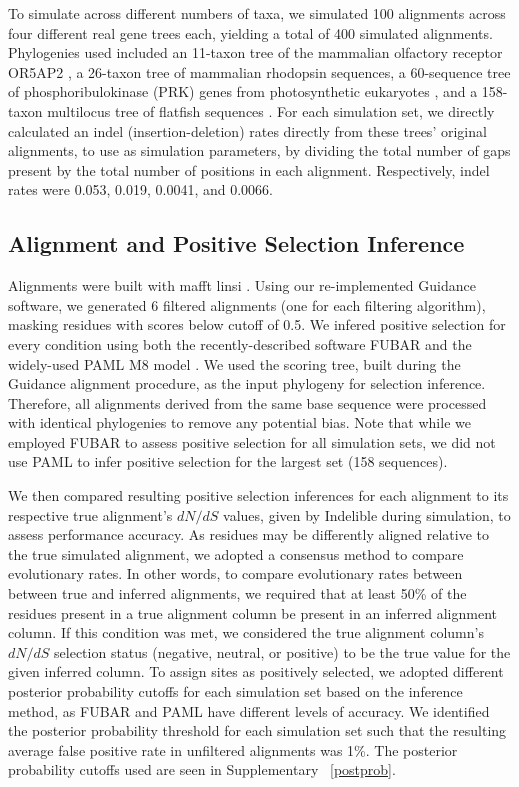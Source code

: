 \documentclass[10pt]{article}
\begin{document}
To simulate across different numbers of taxa, we simulated 100 alignments across four different real gene trees each, yielding a total of 400 simulated alignments. Phylogenies used included an 11-taxon tree of the mammalian olfactory receptor OR5AP2 \citep{Spielman2013}, a 26-taxon tree of mammalian rhodopsin sequences\citep{Spielman2013}, a 60-sequence tree of phosphoribulokinase (PRK) genes from photosynthetic eukaryotes \citep{Yang2011}, and a 158-taxon multilocus tree of flatfish sequences \citep{Betancur2013}.
For each simulation set, we directly calculated an indel (insertion-deletion) rates directly from these trees’ original alignments, to use as simulation parameters, by dividing the total number of gaps present by the total number of positions in each alignment. Respectively, indel rates were 0.053, 0.019, 0.0041, and 0.0066. 

\subsection*{Alignment and Positive Selection Inference}
Alignments were built with mafft linsi \citep{Katoh2002,Katoh2005}. Using our re-implemented Guidance software, we generated 6 filtered alignments (one for each filtering algorithm), masking residues with scores below cutoff of 0.5. We infered positive selection for every condition using both the recently-described software FUBAR \citep{Murrell2013} and the widely-used PAML M8 model \citep{Yang2007}. We used the scoring tree, built during the Guidance alignment procedure, as the input phylogeny for selection inference. Therefore, all alignments derived from the same base sequence were processed with identical phylogenies to remove any potential bias. Note that while we employed FUBAR to assess positive selection for all simulation sets, we did not use PAML to infer positive selection for the largest set (158 sequences).

We then compared resulting positive selection inferences for each alignment to its respective true alignment's $dN/dS$ values, given by Indelible during simulation, to assess performance accuracy. As residues may be differently aligned relative to the true simulated alignment, we adopted a consensus method to compare evolutionary rates. In other words, to compare evolutionary rates between between true and inferred alignments, we required that at least 50\% of the residues present in a true alignment column be present in an inferred alignment column. If this condition was met, we considered the true alignment column’s $dN/dS$  selection status (negative, neutral, or positive) to be the true value for the given inferred column. To assign sites as positively selected, we adopted different posterior probability cutoffs for each simulation set based on the inference method, as FUBAR and PAML have different levels of accuracy. We identified the posterior probability threshold for each simulation set such that the resulting average false positive rate in unfiltered alignments was 1\%. The posterior probability cutoffs used are seen in Supplementary ~\ref{postprob}.
\end{document}
